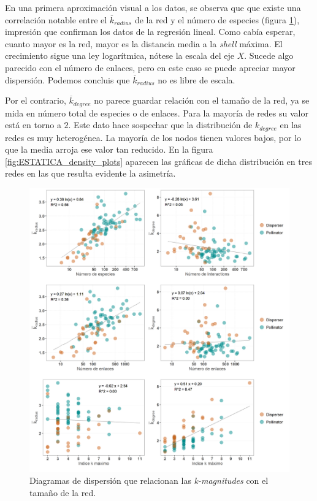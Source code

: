 En una primera aproximación visual a los datos, se observa que que existe una correlación notable entre el $\overline{k}_{radius}$ de la red y el número de especies (figura \ref{fig:ESTATICA_tamanyo_kdegree_kradius}), impresión que confirman los datos de la regresión lineal. Como cabía esperar, cuanto mayor es la red, mayor es la distancia media a la \textit{shell} máxima. El crecimiento sigue una ley logarítmica, nótese la escala del eje $X$. Sucede algo parecido con el número de enlaces, pero en este caso se puede apreciar mayor dispersión. Podemos concluis que $\overline{k}_{radius}$ no es libre de escala.

Por el contrario, $\overline{k}_{degree}$ no parece guardar relación con el tamaño de la red, ya se mida en número total de especies o de enlaces. Para la mayoría de redes su valor está en torno a $2$. Este dato hace sospechar que la distribución de ${k}_{degree}$ en las redes es muy heterogénea. La mayoría de los nodos tienen valores bajos, por lo que la media arroja ese valor tan reducido. En la figura \ref{fig:ESTATICA_density_plots} aparecen las gráficas de dicha distribución en tres redes en las que resulta evidente la asimetría. 

\begin{figure}[h!]
\centering
\includegraphics[scale=0.55]{Figures/ESTATICA_tamanyo_kdegree_kradius.png}
\caption{Diagramas de dispersión que relacionan las \textit{k-magnitudes} con el tamaño de la red.}
\label{fig:ESTATICA_tamanyo_kdegree_kradius}
\end{figure}

